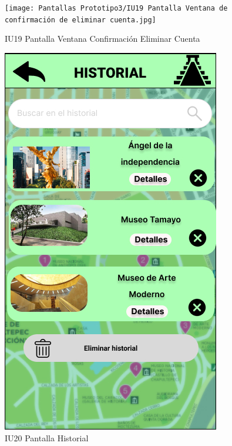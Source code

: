 \begin{figure}[h]
    \begin{minipage}{0.5\textwidth}
        \centering
        \texttt{[image: Pantallas Prototipo3/IU19 Pantalla Ventana de confirmación de eliminar cuenta.jpg]}
        \caption{IU19 Pantalla Ventana Confirmación Eliminar Cuenta}
    \end{minipage}
    
    \begin{minipage}{0.5\textwidth}
        \centering
        \includegraphics[width=.7\linewidth]{Pantallas Prototipo3/IU20 Pantalla Historial.jpg}
        \caption{IU20 Pantalla Historial}
    \end{minipage}%
\end{figure}

